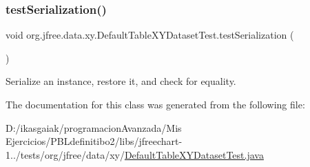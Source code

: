 \subsubsection{\texorpdfstring{test\+Serialization()}{testSerialization()}}
{\footnotesize\ttfamily void org.\+jfree.\+data.\+xy.\+Default\+Table\+X\+Y\+Dataset\+Test.\+test\+Serialization (\begin{DoxyParamCaption}{ }\end{DoxyParamCaption})}

Serialize an instance, restore it, and check for equality. 

The documentation for this class was generated from the following file\+:\begin{DoxyCompactItemize}
\item 
D\+:/ikasgaiak/programacion\+Avanzada/\+Mis Ejercicios/\+P\+B\+Ldefinitibo2/libs/jfreechart-\/1../tests/org/jfree/data/xy/\mbox{\hyperlink{_default_table_x_y_dataset_test_8java}{Default\+Table\+X\+Y\+Dataset\+Test.\+java}}\end{DoxyCompactItemize}
